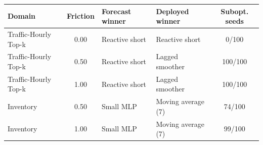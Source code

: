 \begin{tabularx}{\columnwidth}{@{}XcXXc@{}}
\toprule
Domain & Friction & Forecast winner & Deployed winner & Subopt. seeds \\
\midrule
Traffic-Hourly Top-k & 0.00 & Reactive short & Reactive short & 0/100 \\
Traffic-Hourly Top-k & 0.50 & Reactive short & Lagged smoother & 100/100 \\
Traffic-Hourly Top-k & 1.00 & Reactive short & Lagged smoother & 100/100 \\
\addlinespace
Inventory & 0.50 & Small MLP & Moving average (7) & 74/100 \\
Inventory & 1.00 & Small MLP & Moving average (7) & 99/100 \\
\bottomrule
\end{tabularx}
